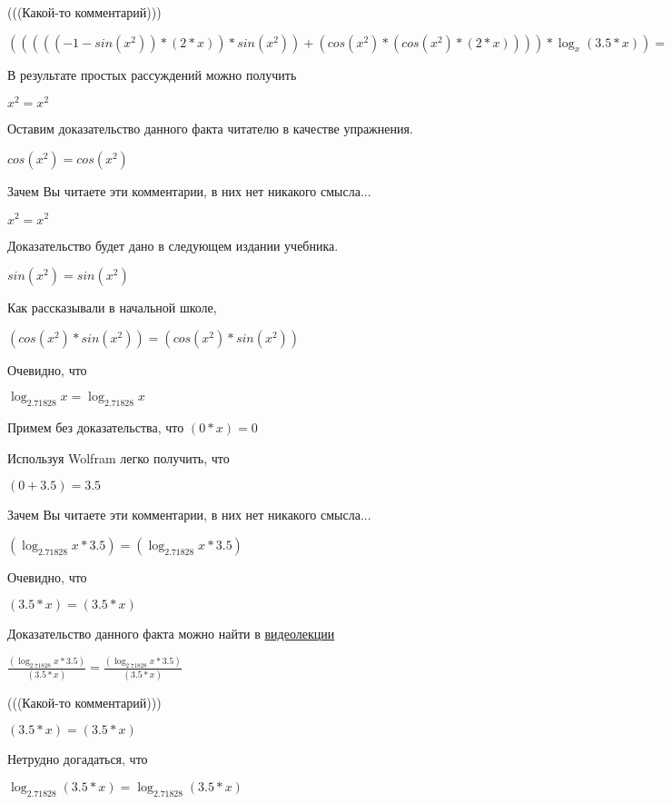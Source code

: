 \documentclass[12pt,a4paper,fleqn]{article}
\theoremstyle{definition}
\begin{document}
(((Какой-то комментарий)))

$((((( -1  - sin({ x }^{ 2 })) * ( 2  *  x )) * sin({ x }^{ 2 })) + (cos({ x }^{ 2 }) * (cos({ x }^{ 2 }) * ( 2  *  x )))) * \log_{ x }{( 3.5  *  x )}) = ((((( -1  - sin({ x }^{ 2 })) * ( 2  *  x )) * sin({ x }^{ 2 })) + (cos({ x }^{ 2 }) * (cos({ x }^{ 2 }) * ( 2  *  x )))) * \log_{ x }{( 3.5  *  x )})$

В результате простых рассуждений можно получить

${ x }^{ 2 } = { x }^{ 2 }$

Оставим доказательство данного факта читателю в качестве упражнения.

$cos({ x }^{ 2 }) = cos({ x }^{ 2 })$

Зачем Вы читаете эти комментарии, в них нет никакого смысла...

${ x }^{ 2 } = { x }^{ 2 }$

Доказательство будет дано в следующем издании учебника.

$sin({ x }^{ 2 }) = sin({ x }^{ 2 })$

Как рассказывали в начальной школе,

$(cos({ x }^{ 2 }) * sin({ x }^{ 2 })) = (cos({ x }^{ 2 }) * sin({ x }^{ 2 }))$

Очевидно, что

$\log_{ 2.71828 }{ x } = \log_{ 2.71828 }{ x }$

Примем без доказательства, что
$( 0  *  x ) =  0 $

Используя Wolfram легко получить, что

$( 0  +  3.5 ) =  3.5 $

Зачем Вы читаете эти комментарии, в них нет никакого смысла...

$(\log_{ 2.71828 }{ x } *  3.5 ) = (\log_{ 2.71828 }{ x } *  3.5 )$

Очевидно, что

$( 3.5  *  x ) = ( 3.5  *  x )$

Доказательство данного факта можно найти в \href{https://www.youtube.com/watch?v=dQw4w9WgXcQ}{видеолекции}

$\frac{(\log_{ 2.71828 }{ x } *  3.5 )}{( 3.5  *  x )}
 = \frac{(\log_{ 2.71828 }{ x } *  3.5 )}{( 3.5  *  x )}
$

(((Какой-то комментарий)))

$( 3.5  *  x ) = ( 3.5  *  x )$

Нетрудно догадаться, что

$\log_{ 2.71828 }{( 3.5  *  x )} = \log_{ 2.71828 }{( 3.5  *  x )}$
\end{document}
